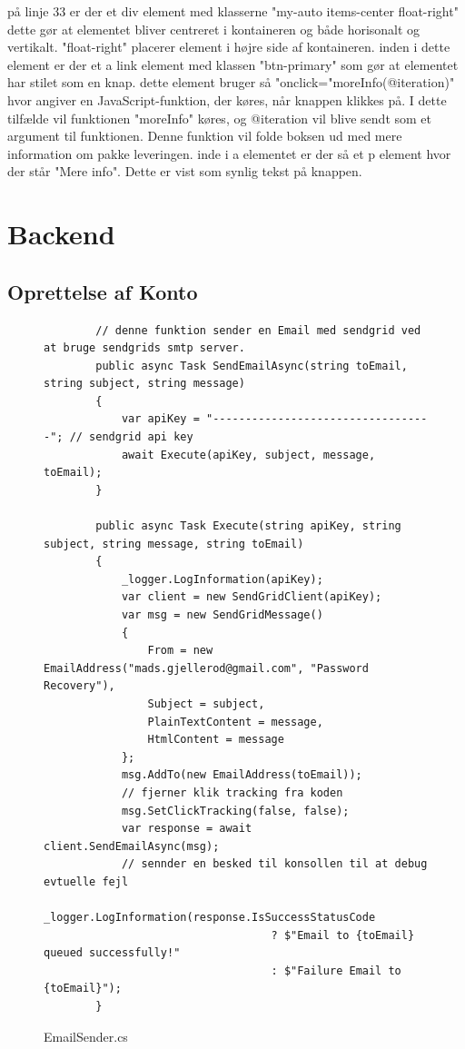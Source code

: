 på linje 33 er der et div element med klasserne "my-auto items-center float-right" dette gør at elementet bliver centreret i kontaineren og både horisonalt og vertikalt.
"float-right" placerer element i højre side af kontaineren. inden i dette element er der et a link element med klassen "btn-primary" som gør at elementet 
har stilet som en knap. dette element bruger så "onclick="moreInfo(@iteration)" hvor angiver en JavaScript-funktion, der køres, når knappen klikkes på. I dette tilfælde vil funktionen "moreInfo" 
køres, og @iteration vil blive sendt som et argument til funktionen. Denne funktion vil folde boksen ud med mere information om pakke leveringen. inde i a elementet 
er der så et p element hvor der står "Mere info". Dette er vist som synlig tekst på knappen.





\section{Backend}
\subsection{Oprettelse af Konto}
\newpage
\begin{figure}[!ht]
    \begin{verbatim}
        // denne funktion sender en Email med sendgrid ved at bruge sendgrids smtp server.
        public async Task SendEmailAsync(string toEmail, string subject, string message)
        {
            var apiKey = "----------------------------------"; // sendgrid api key
            await Execute(apiKey, subject, message, toEmail);
        }
    
        public async Task Execute(string apiKey, string subject, string message, string toEmail)
        {
            _logger.LogInformation(apiKey);
            var client = new SendGridClient(apiKey);
            var msg = new SendGridMessage()
            {
                From = new EmailAddress("mads.gjellerod@gmail.com", "Password Recovery"),
                Subject = subject,
                PlainTextContent = message,
                HtmlContent = message
            };
            msg.AddTo(new EmailAddress(toEmail));
            // fjerner klik tracking fra koden 
            msg.SetClickTracking(false, false);
            var response = await client.SendEmailAsync(msg);
            // sennder en besked til konsollen til at debug evtuelle fejl
            _logger.LogInformation(response.IsSuccessStatusCode
                                   ? $"Email to {toEmail} queued successfully!"
                                   : $"Failure Email to {toEmail}");
        }
    \end{verbatim}
\caption{EmailSender.cs}\label{code:EmailSender.cs}
\end{figure}

